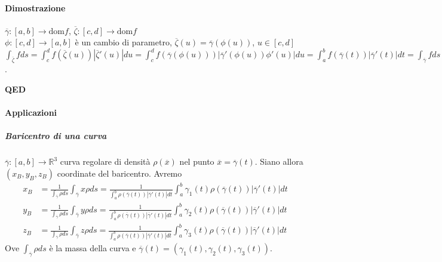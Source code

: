 \documentclass{article}
\newcommand{\R}{\mathbb{R}}
\newcommand{\dom}{\text{dom}}
\begin{document}
\paragraph{{Dimostrazione}}
$\overline{\gamma}:[a,b]\rightarrow \dom f$, $\overline{\zeta}:[c,d]\rightarrow \dom f$\\
$\phi: [c,d]\rightarrow [a,b]$ è un cambio di parametro, $\overline{\zeta}(u)=\overline{\gamma}(\phi(u))$, $u\in [c,d]$\\
$\int_{\overline{\zeta}}f ds = \int_c^d f(\overline{\zeta}(u))|\overline{\zeta}'(u)|du= \int_c^d f(\overline{\gamma}(\phi(u)))|\overline{\gamma}'(\phi(u))\phi'(u)|du=\int_a^b f(\overline{\gamma}(t))|\overline{\gamma}'(t)|dt=\int_{\overline{\gamma}} f ds$.
\begin{flushright}
    \textbf{QED}
\end{flushright}

\paragraph{{Applicazioni}}
\subparagraph{{\textbf{Baricentro  di una curva}}}
$\overline{\gamma}:[a,b]\rightarrow \R^3$ curva regolare di densità $\rho(\overline{x})$ nel punto $\overline{x}=\overline{\gamma}(t)$. Siano allora $(x_B,y_B,z_B)$ coordinate del baricentro. Avremo
\begin{align*}
    x_B&=\frac{1}{\int_{\overline{\gamma}}\rho ds}\int_{\overline{\gamma}}x\rho ds=\frac{1}{\int_a^b \rho(\overline{\gamma}(t))|\overline{\gamma}'(t)|dt}\int_a^b \gamma_1(t)\rho(\overline{\gamma}(t))|\overline{\gamma}'(t)|dt\\
y_B&=\frac{1}{\int_{\overline{\gamma}}\rho ds}\int_{\overline{\gamma}}y \rho ds= \frac{1}{\int_a^b \rho(\overline{\gamma}(t))|\overline{\gamma}'(t)|dt}\int_a^b \gamma_2(t)\rho(\overline{\gamma}(t))|\overline{\gamma}'(t)|dt\\
z_B&=\frac{1}{\int_{\overline{\gamma}}\rho ds}\int_{\overline{\gamma}}z \rho ds= \frac{1}{\int_a^b \rho(\overline{\gamma}(t))|\overline{\gamma}'(t)|dt}\int_a^b \gamma_3(t)\rho(\overline{\gamma}(t))|\overline{\gamma}'(t)|dt
\end{align*}
Ove $\int_{\overline{\gamma}}\rho ds$ è la massa della curva e $\overline{\gamma}(t)=(\gamma_1(t),\gamma_2(t),\gamma_3(t))$.
\end{document}
